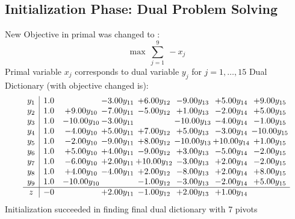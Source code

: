 \documentclass[9pt]{article}
\begin{document}
\subsection{Initialization Phase: Dual Problem Solving}
New Objective in primal was changed to : \[ \max\ \sum_{j=1}^{9}\ - x_j \] 
Primal variable $x_j$ corresponds to dual variable $y_j$ for $j = 1,\ldots,15$
Dual Dictionary (with objective changed is): 
\[\begin{array}{c| c c@{\hskip 2pt} c@{\hskip 2pt} c@{\hskip 2pt} c@{\hskip 2pt} c@{\hskip 2pt} c@{\hskip 2pt} }
 y_{1}   &  1.0  &   & -3.00 y_{11} & +  6.00 y_{12} & -9.00 y_{13} & +  5.00 y_{14} & +  9.00 y_{15}\\
 y_{2}   &  1.0 & +  9.00 y_{10} & -7.00 y_{11} & -5.00 y_{12} & +  1.00 y_{13} & -2.00 y_{14} & +  5.00 y_{15}\\
 y_{3}   &  1.0 & -10.00 y_{10} & -3.00 y_{11} &   & -10.00 y_{13} & -4.00 y_{14} & -1.00 y_{15}\\
 y_{4}   &  1.0 & -4.00 y_{10} & +  5.00 y_{11} & +  7.00 y_{12} & +  5.00 y_{13} & -3.00 y_{14} & -10.00 y_{15}\\
 y_{5}   &  1.0 & -2.00 y_{10} & -9.00 y_{11} & +  8.00 y_{12} & -10.00 y_{13} & + 10.00 y_{14} & +  1.00 y_{15}\\
 y_{6}   &  1.0 & +  5.00 y_{10} & +  4.00 y_{11} & -9.00 y_{12} & +  3.00 y_{13} & -5.00 y_{14} & -2.00 y_{15}\\
 y_{7}   &  1.0 & -6.00 y_{10} & +  2.00 y_{11} & + 10.00 y_{12} & -3.00 y_{13} & +  2.00 y_{14} & -2.00 y_{15}\\
 y_{8}   &  1.0 & +  4.00 y_{10} & -4.00 y_{11} & +  2.00 y_{12} & -8.00 y_{13} & +  2.00 y_{14} & +  8.00 y_{15}\\
 y_{9}   &  1.0 & -10.00 y_{10} &   & -1.00 y_{12} & -3.00 y_{13} & -2.00 y_{14} & +  5.00 y_{15}\\
\hline
z    &  -0  &   & +  2.00 y_{11} & -1.00 y_{12} & +  2.00 y_{13} & +  1.00 y_{14} &   \\
\end{array}\]
Initialization succeeded in finding final dual dictionary with 7 pivots
\end{document}
